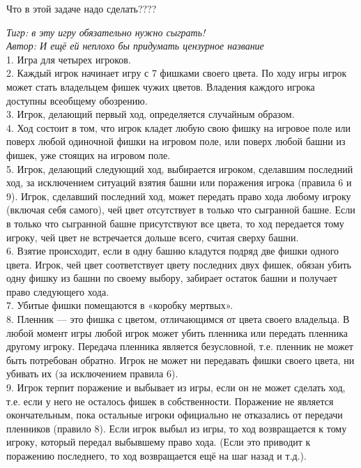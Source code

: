 \begin{problem} 
{\red Что в этой задаче надо сделать????}

{\it Тигр: в эту игру обязательно нужно сыграть!}\\
{\it Автор: И ещё ей неплохо бы придумать цензурное название}\\
1. Игра для четырех игроков.\\
2. Каждый игрок начинает игру с 7 фишками своего цвета. По ходу игры игрок может стать владельцем фишек чужих цветов. Владения каждого игрока доступны всеобщему обозрению.\\
3. Игрок, делающий первый ход, определяется случайным образом.\\
4. Ход состоит в том, что игрок кладет любую свою фишку на игровое поле или поверх любой одиночной фишки на игровом поле, или поверх любой башни из фишек, уже стоящих на игровом поле.\\
5. Игрок, делающий следующий ход, выбирается игроком, сделавшим последний ход, за исключением ситуаций взятия башни или поражения игрока (правила 6 и 9). Игрок, сделавший последний ход, может передать право хода любому игроку (включая себя самого), чей цвет отсутствует в только что сыгранной башне. Если в только что сыгранной башне присутствуют все цвета, то ход передается тому игроку, чей цвет не встречается дольше всего, считая сверху башни.\\
6. Взятие происходит, если в одну башню кладутся подряд две фишки одного цвета. Игрок, чей цвет соответствует цвету последних двух фишек, обязан убить одну фишку из башни по своему выбору, забирает остаток башни и получает право следующего хода.\\
7. Убитые фишки помещаются в «коробку мертвых».\\
8. Пленник — это фишка с цветом, отличающимся от цвета своего владельца. В любой момент игры любой игрок может убить пленника или передать пленника другому игроку. Передача пленника является безусловной, т.е. пленник не может быть потребован обратно. Игрок не может ни передавать фишки своего цвета, ни убивать их (за исключением правила 6).\\
9. Игрок терпит поражение и выбывает из игры, если он не может сделать ход, т.е. если у него не осталось фишек в собственности. Поражение не является окончательным, пока остальные игроки официально не отказались от передачи пленников (правило 8). Если игрок выбыл из игры, то ход возвращается к тому игроку, который передал выбывшему право хода. (Если это приводит к поражению последнего, то ход возвращается ещё на шаг назад и т.д.).\\

\end{problem}
